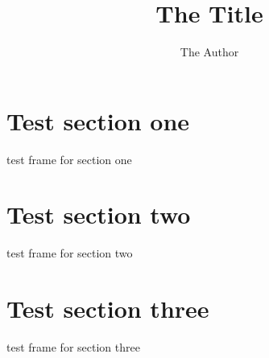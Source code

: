 \documentclass{beamer}
\title{The Title}
\author{The Author}
\institute{The Institute}
\begin{document}
\begin{frame}
\maketitle
\end{frame}

\section{Test section one}
\begin{frame}
test frame for section one
\end{frame}

{
\AtBeginSection[]{}
\section{Test section two}
\begin{frame}
test frame for section two
\end{frame}
}

\section{Test section three}
\begin{frame}
test frame for section three
\end{frame}
\end{document}
